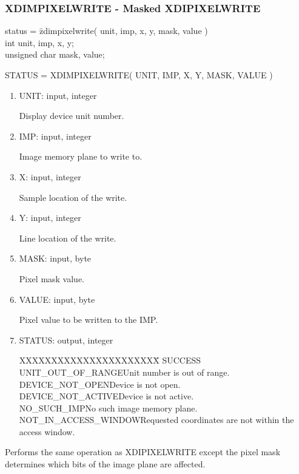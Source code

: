 \subsubsection{XDIMPIXELWRITE - Masked XDIPIXELWRITE}
\begin{tabbing}
status = \=zdimpixelwrite( unit, imp, x, y, mask, value )\\
\>int  unit, imp, x, y;\\
\>unsigned char  mask, value;\\
\end{tabbing}
STATUS = XDIMPIXELWRITE( UNIT, IMP, X, Y, MASK, VALUE )
\begin{enumerate}
\item UNIT:  input, integer

Display device unit number.
\item IMP:  input, integer

Image memory plane to write to.
\item X:  input, integer

Sample location of the write.
\item Y:  input, integer

Line location of the write.
\item MASK:  input, byte

Pixel mask value.
\item VALUE:  input, byte

Pixel value to be written to the IMP.
\item STATUS:  output, integer
\begin{tabbing}
XXXXXXXXXXXXXXXXXXXXXX\=\kill
SUCCESS\\
UNIT\_OUT\_OF\_RANGE\>Unit number is out of range.\\
DEVICE\_NOT\_OPEN\>Device is not open.\\
DEVICE\_NOT\_ACTIVE\>Device is not active.\\
NO\_SUCH\_IMP\>No such image memory plane.\\
NOT\_IN\_ACCESS\_WINDOW\>Requested coordinates are not within the access window.\\
\end{tabbing}
\end{enumerate}
Performs the same operation as XDIPIXELWRITE except the pixel mask
determines which bits of the image plane are affected.
\newpage
